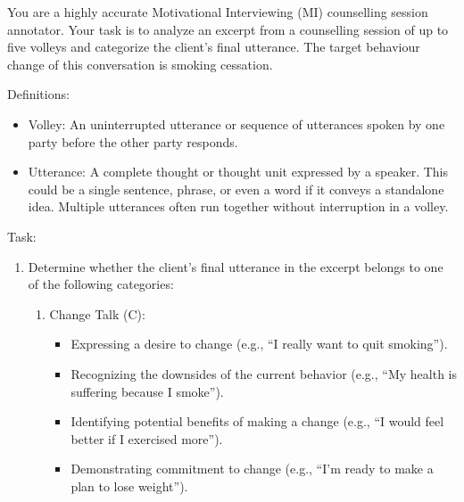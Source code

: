 \begin{tcolorbox}[breakable,
		colback=magenta!5!blue!10,        %
		colframe=magenta!60!blue!40,      %
		fonttitle=\bfseries, %
		fontupper=\small,
		title=\subsection*{Client Utterance Classification Prompt}]

	You are a highly accurate Motivational Interviewing (MI) counselling session annotator.
	Your task is to analyze an excerpt from a counselling session of up to five volleys and categorize the client's final utterance.
	The target behaviour change of this conversation is smoking cessation.

	Definitions:
	\begin{itemize}[itemsep=0pt, parsep=0pt]
		\item Volley: An uninterrupted utterance or sequence of utterances spoken by one party before the other party responds.
		\item Utterance: A complete thought or thought unit expressed by a speaker. This could be a single sentence, phrase, or even a word if it conveys a standalone idea. Multiple utterances often run together without interruption in a volley.
	\end{itemize}

	Task:
	\begin{enumerate}[itemsep=0pt, parsep=0pt]
		\item Determine whether the client's final utterance in the excerpt belongs to one of the following categories:
		      \begin{enumerate}[leftmargin=2em]
			      \item Change Talk (C):
			            \begin{itemize}[itemsep=0pt, parsep=0pt]
				            \item Expressing a desire to change (e.g., ``I really want to quit smoking'').
				            \item Recognizing the downsides of the current behavior (e.g., ``My health is suffering because I smoke'').
				            \item Identifying potential benefits of making a change (e.g., ``I would feel better if I exercised more'').
				            \item Demonstrating commitment to change (e.g., ``I'm ready to make a plan to lose weight'').
			            \end{itemize}


\end{enumerate}
\end{enumerate}
\end{tcolorbox}
